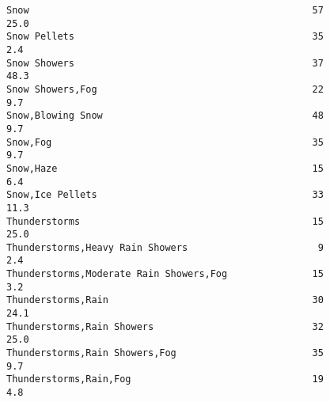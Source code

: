 \documentclass[11pt]{article}
\begin{document}
\begin{tcolorbox}[breakable, size=fbox, boxrule=.5pt, pad at break*=1mm, opacityfill=0]
\begin{Verbatim}[commandchars=\\\{\}]
Snow                                                  57           25.0
Snow Pellets                                          35            2.4
Snow Showers                                          37           48.3
Snow Showers,Fog                                      22            9.7
Snow,Blowing Snow                                     48            9.7
Snow,Fog                                              35            9.7
Snow,Haze                                             15            6.4
Snow,Ice Pellets                                      33           11.3
Thunderstorms                                         15           25.0
Thunderstorms,Heavy Rain Showers                       9            2.4
Thunderstorms,Moderate Rain Showers,Fog               15            3.2
Thunderstorms,Rain                                    30           24.1
Thunderstorms,Rain Showers                            32           25.0
Thunderstorms,Rain Showers,Fog                        35            9.7
Thunderstorms,Rain,Fog                                19            4.8


\end{Verbatim}
\end{tcolorbox}
\end{document}
